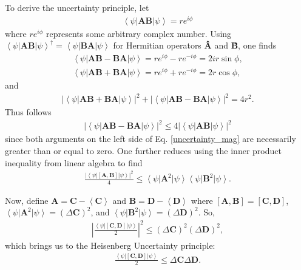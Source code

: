 \documentclass[11pt]{article} %
\newcommand{\bra}[1]{\left\langle #1 \right|}
\newcommand{\ket}[1]{\left|#1\right\rangle}
\begin{document}
To derive the uncertainty principle, let
\begin{align}
    \bra{\psi}\textbf{AB}\ket{\psi} = re^{i\phi}
\end{align}
where $re^{i\phi}$ represents some arbitrary complex number. Using $\bra{\psi}\textbf{AB}\ket{\psi}^\dagger = \bra{\psi}\textbf{BA}\ket{\psi}$ for Hermitian operators \textbf{\^A} and \textbf{\^B}, one finds
\begin{align}
    \bra{\psi}\textbf{AB}-\textbf{BA}\ket{\psi} = re^{i\phi} - re^{-i\phi} = 2ir\sin\phi,\\
    \bra{\psi}\textbf{AB}+\textbf{BA}\ket{\psi} = re^{i\phi} + re^{-i\phi} = 2r\cos\phi,
\end{align}{}
and
\begin{align}
    \left|\bra{\psi}\textbf{AB}+\textbf{BA}\ket{\psi}\right|^2 + \left|\bra{\psi}\textbf{AB}-\textbf{BA}\ket{\psi}\right|^2 = 4r^2.
    \label{uncertainty_mag}
\end{align}
Thus follows
\begin{align}
    \left|\bra{\psi}\textbf{AB}-\textbf{BA}\ket{\psi}\right|^2 \leq 4\left|\bra{\psi}\textbf{AB}\ket{\psi}\right|^2
\end{align}
since both arguments on the left side of 
Eq. \ref{uncertainty_mag} are necessarily greater than or equal to zero. One further reduces using the inner product inequality from linear algebra to find
\begin{align}
    \frac{\left|\bra{\psi}\left[\textbf{A},\textbf{B}\right]\ket{\psi}\right|^2}{4} \leq \bra{\psi}\textbf{A}^2\ket{\psi}\bra{\psi}\textbf{B}^2\ket{\psi}.
\end{align}

Now, define $\textbf{A} = \textbf{C} - \left<\textbf{C}\right>$ and $\textbf{B} = \textbf{D} - \left<\textbf{D}\right>$ where $\left[\textbf{A},\textbf{B}\right] = \left[\textbf{C},\textbf{D}\right]$, $\bra{\psi}\textbf{A}^2\ket{\psi} = \left(\Delta\textbf{C}\right)^2$, and $\bra{\psi}\textbf{B}^2\ket{\psi} = \left(\Delta\textbf{D}\right)^2$. So,
\begin{align}
    \left|\frac{\bra{\psi}\left[\textbf{C},\textbf{D}\right]\ket{\psi}}{2}\right|^2 \leq \left(\Delta\textbf{C}\right)^2\left(\Delta\textbf{D}\right)^2,
\end{align}
which brings us to the Heisenberg Uncertainty principle:
\begin{align}
    \frac{\bra{\psi}\left[\textbf{C},\textbf{D}\right]\ket{\psi}}{2} \leq \Delta\textbf{C}\Delta\textbf{D}.
\end{align}
\end{document}
